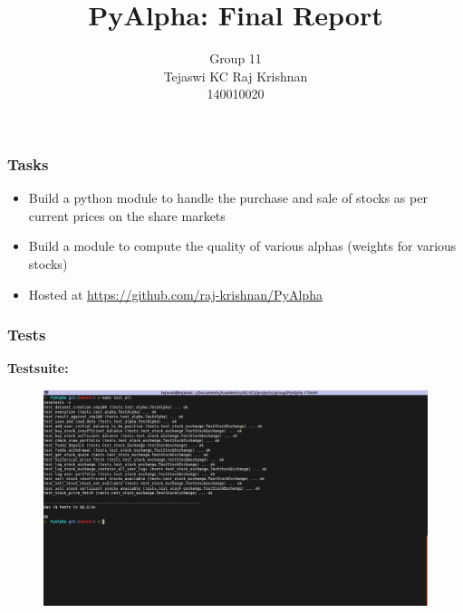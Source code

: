 \documentclass[serif,mathserif]{beamer}
\author[Tejaswi KC, Raj Krishnan]{Group 11 \\ Tejaswi KC \quad Raj Krishnan \\ 140010020 \quad 140010007}
\title[PyAlpha\hspace{2em}\insertframenumber/\inserttotalframenumber]{PyAlpha: Final Report}
\institute{Indian Institute of Technology, Bombay}
\begin{document}
    \maketitle

    \begin{frame}

        \frametitle{Tasks}

        \begin{itemize}
            \item Build a python module to handle the purchase and sale of stocks
                  as per current prices on the share markets
            \item Build a module to compute the quality of various alphas
                  (weights for various stocks)
            \item Hosted at \url{https://github.com/raj-krishnan/PyAlpha}
        \end{itemize}

    \end{frame}

    \begin{frame}

        \frametitle{Tests}

        \textbf{Testsuite:}
        \begin{figure}
            \centering
            \includegraphics[width = \linewidth]{testsuite.png}
        \end{figure}

    \end{frame}
\end{document}
